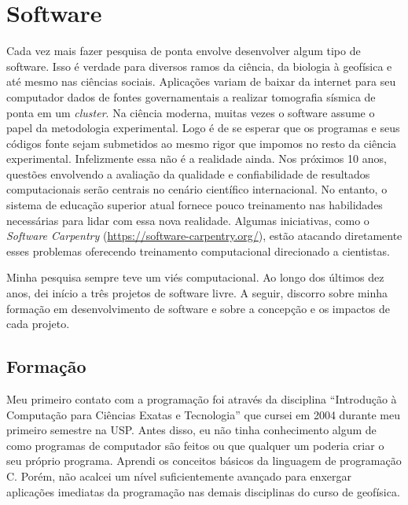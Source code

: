 \section{Software}

Cada vez mais fazer pesquisa de ponta envolve desenvolver algum tipo de
software.
Isso é verdade para diversos ramos da ciência, da biologia à geofísica e até
mesmo nas ciências sociais.
Aplicações variam de baixar da internet para seu computador dados de fontes
governamentais
a realizar tomografia sísmica de ponta em um \textit{cluster}.
Na ciência moderna, muitas vezes o software assume o papel da metodologia
experimental.
Logo é de se esperar que os programas e seus códigos fonte sejam submetidos
ao mesmo rigor que impomos no resto da ciência experimental.
Infelizmente essa não é a realidade ainda.
Nos próximos 10 anos, questões envolvendo a avaliação da qualidade e
confiabilidade de resultados computacionais serão centrais no cenário
científico internacional.
No entanto, o sistema de educação superior atual fornece pouco treinamento nas
habilidades necessárias para lidar com essa nova realidade.
Algumas iniciativas, como o \textit{Software Carpentry}
(\url{https://software-carpentry.org/}), estão atacando diretamente esses
problemas oferecendo treinamento computacional direcionado a cientistas.

Minha pesquisa sempre teve um viés computacional.
Ao longo dos últimos dez anos, dei início a três projetos de software livre.
A seguir, discorro sobre minha formação em desenvolvimento de software e sobre
a concepção e os impactos de cada projeto.


\subsection{Formação}

Meu primeiro contato com a programação foi através da disciplina
``Introdução à Computação para Ciências Exatas e Tecnologia''
que cursei em 2004 durante meu primeiro semestre na USP.
Antes disso, eu não tinha conhecimento algum de como programas de computador
são feitos ou que qualquer um poderia criar o seu próprio programa.
Aprendi os conceitos básicos da linguagem de programação C.
Porém, não acalcei um nível suficientemente avançado para enxergar aplicações
imediatas da programação nas demais disciplinas do curso de geofísica.

